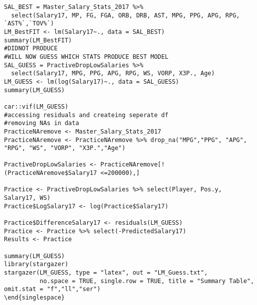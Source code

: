 \documentclass{article}
\begin{document}
\begin{flushleft}
\begin{lstlisting}
SAL_BEST = Master_Salary_Stats_2017 %>%
  select(Salary17, MP, FG, FGA, ORB, DRB, AST, MPG, PPG, APG, RPG, `AST%`,`TOV%`)
LM_BestFIT <- lm(Salary17~., data = SAL_BEST)
summary(LM_BestFIT)
#DIDNOT PRODUCE 
#WILL NOW GUESS WHICH STATS PRODUCE BEST MODEL
SAL_GUESS = PractiveDropLowSalaries %>%
  select(Salary17, MPG, PPG, APG, RPG, WS, VORP, X3P., Age)
LM_GUESS <- lm(log(Salary17)~., data = SAL_GUESS)
summary(LM_GUESS)

car::vif(LM_GUESS)
#accessing residuals and createing seperate df
#removing NAs in data
PracticeNAremove <- Master_Salary_Stats_2017
PracticeNAremove <- PracticeNAremove %>% drop_na("MPG","PPG", "APG", "RPG", "WS", "VORP", "X3P.","Age")

PractiveDropLowSalaries <- PracticeNAremove[!(PracticeNAremove$Salary17 <=200000),]

Practice <- PractiveDropLowSalaries %>% select(Player, Pos.y, Salary17, WS)
Practice$LogSalary17 <- log(Practice$Salary17)

Practice$DifferenceSalary17 <- residuals(LM_GUESS)
Practice <- Practice %>% select(-PredictedSalary17)
Results <- Practice

summary(LM_GUESS)
library(stargazer)
stargazer(LM_GUESS, type = "latex", out = "LM_Guess.txt",
          no.space = TRUE, single.row = TRUE, title = "Summary Table", omit.stat = "f","ll","ser")
\end{singlespace}
\end{lstlisting}



\end{flushleft}
\end{document}
